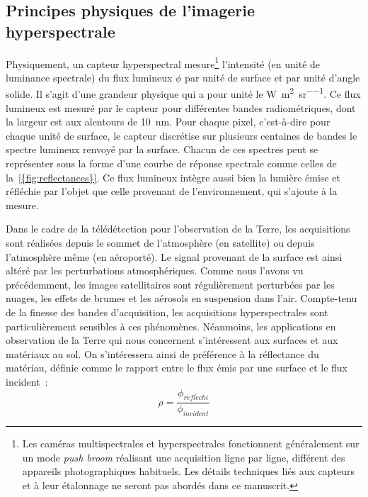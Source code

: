 \subsection{Principes physiques de l'imagerie hyperspectrale}
\label{sec:principes_hsi}

Physiquement, un capteur hyperspectral mesure\footnote{Les caméras multispectrales et hyperspectrales fonctionnent généralement sur un mode \emph{push broom} réalisant une acquisition ligne par ligne, différent des appareils photographiques habituels. Les détails techniques liés aux capteurs et à leur étalonnage ne seront pas abordés dans ce manuscrit.} l'intensité (en unité de luminance spectrale) du flux lumineux $\phi$ par unité de surface et par unité d'angle solide. Il s'agit d'une grandeur physique qui a pour unité le \si{\watt\per\square\meter\per\steradian}. Ce flux lumineux est mesuré par le capteur pour différentes bandes radiométriques, dont la largeur est aux alentours de \SI{10}{\nano\meter}. Pour chaque pixel, c'est-à-dire pour chaque unité de surface, le capteur discrétise sur plusieurs centaines de bandes le spectre lumineux renvoyé par la surface. Chacun de ces spectres peut se représenter sous la forme d'une courbe de réponse spectrale comme celles de la~\cref{{fig:reflectances}}. Ce flux lumineux intègre aussi bien la lumière émise et réfléchie par l'objet que celle provenant de l'environnement, qui s'ajoute à la mesure.

Dans le cadre de la télédétection pour l'observation de la Terre, les acquisitions sont réalisées depuis le sommet de l'atmosphère (en satellite) ou depuis l'atmosphère même (en aéroporté). Le signal provenant de la surface est ainsi altéré par les perturbations atmosphériques. Comme nous l'avons vu précédemment, les images satellitaires sont régulièrement perturbées par les nuages, les effets de brumes et les aérosols en suspension dans l'air. Compte-tenu de la finesse des bandes d'acquisition, les acquisitions hyperspectrales sont particulièrement sensibles à ces phénomènes. Néanmoins, les applications en observation de la Terre qui nous concernent s'intéressent aux surfaces et aux matériaux au sol. On s'intéressera ainsi de préférence à la réflectance du matériau, définie comme le rapport entre le flux émis par une surface et le flux incident~:
\begin{equation}
  \rho = \frac{\phi_{\mathit{r\acute{e}fl\acute{e}chi}}}{\phi_\mathit{incident}}
\end{equation}

